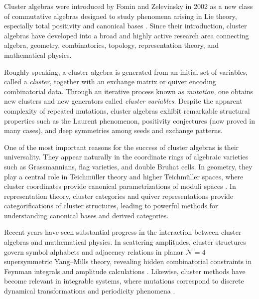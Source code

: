 \documentclass[12pt,a4paper]{article}
\begin{document}



Cluster algebras were introduced by Fomin and Zelevinsky in 2002 as a new class of commutative algebras designed to study phenomena arising in Lie theory, especially total positivity and canonical bases \cite{fomin1}. Since their introduction, cluster algebras have developed into a broad and highly active research area connecting algebra, geometry, combinatorics, topology, representation theory, and mathematical physics.

Roughly speaking, a cluster algebra is generated from an initial set of variables, called a \emph{cluster}, together with an exchange matrix or quiver encoding combinatorial data. Through an iterative process known as \emph{mutation}, one obtains new clusters and new generators called \emph{cluster variables}. Despite the apparent complexity of repeated mutations, cluster algebras exhibit remarkable structural properties such as the Laurent phenomenon, positivity conjectures (now proved in many cases), and deep symmetries among seeds and exchange patterns.

One of the most important reasons for the success of cluster algebras is their universality. They appear naturally in the coordinate rings of algebraic varieties such as Grassmannians, flag varieties, and double Bruhat cells. In geometry, they play a central role in Teichm\"uller theory and higher Teichm\"uller spaces, where cluster coordinates provide canonical parametrizations of moduli spaces \cite{FG2006}. In representation theory, cluster categories and quiver representations provide categorifications of cluster structures, leading to powerful methods for understanding canonical bases and derived categories.

Recent years have seen substantial progress in the interaction between cluster algebras and mathematical physics. In scattering amplitudes, cluster structures govern symbol alphabets and adjacency relations in planar $\mathcal{N}=4$ supersymmetric Yang--Mills theory, revealing hidden combinatorial constraints in Feynman integrals and amplitude calculations \cite{Chicherin2020}. Likewise, cluster methods have become relevant in integrable systems, where mutations correspond to discrete dynamical transformations and periodicity phenomena \cite{GekhtmanIzosimov2024}.
\end{document}
